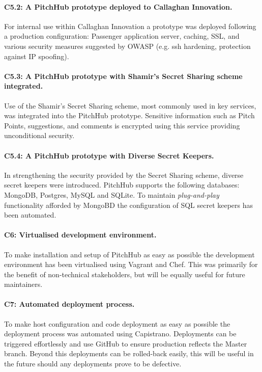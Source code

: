 \paragraph{C5.2: A PitchHub prototype deployed to Callaghan Innovation.} 

For internal use within Callaghan Innovation a prototype was deployed following a production configuration: Passenger application server, caching, SSL, and various security measures suggested by OWASP (e.g. ssh hardening, protection against IP spoofing).


\paragraph{C5.3: A PitchHub prototype with Shamir's Secret Sharing scheme integrated.} 

Use of the Shamir's Secret Sharing scheme, most commonly used in key services, was integrated into the PitchHub prototype. Sensitive information such as Pitch Points, suggestions, and comments is encrypted using this service providing unconditional security.

\paragraph{C5.4: A PitchHub prototype with Diverse Secret Keepers.} 

In strengthening the security provided by the Secret Sharing scheme, diverse secret keepers were introduced. PitchHub supports the following databases: MongoDB, Postgres, MySQL and SQLite. To maintain \textit{plug-and-play} functionality afforded by MongoBD the configuration of SQL secret keepers has been automated.

\paragraph{C6: Virtualised development environment.}

To make installation and setup of PitchHub as easy as possible the development environment has been virtualised using Vagrant and Chef. This was primarily for the benefit of non-technical stakeholders, but will be equally useful for future maintainers.

\paragraph{C7: Automated deployment process.}
 
To make host configuration and code deployment as easy as possible the deployment process was automated using Capistrano. Deployments can be triggered effortlessly and use GitHub to ensure production reflects the Master branch. Beyond this deployments can be rolled-back easily, this will be useful in the future should any deployments prove to be defective.

